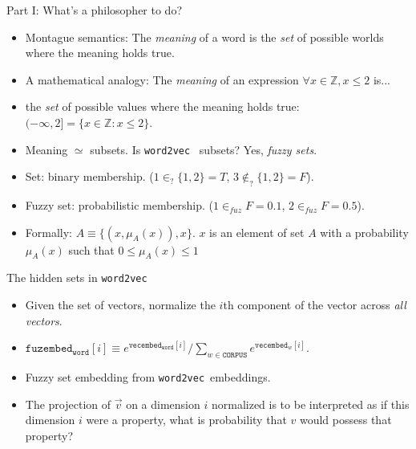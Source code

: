\documentclass[8pt]{beamer}
\newcommand{\Z}{\mathbb Z}
\newcommand{\wtov}{\texttt{word2vec}}
\newcommand{\fuzembed}{\texttt{fuzembed}}
\newcommand{\vecembed}{\texttt{vecembed}}
\newcommand{\CORPUS}{\texttt{CORPUS}}
\newcommand{\word}{\texttt{word}}
\begin{document}
\begin{frame}{Part I: What's a philosopher to do?}
\begin{itemize}
    \item Montague semantics: The \emph{meaning} of a word is the \emph{set} of possible worlds where the meaning holds true. \pause
    \item A mathematical analogy: The \emph{meaning} of an expression $\forall x \in \Z, x \leq 2$ is... \pause
    \item  the \emph{set} of possible values where the meaning holds true: $(-\infty, 2] = \{  x \in \Z : x \leq 2 \}$. \pause
    \item Meaning $\simeq$ subsets. Is  \wtov~ subsets?  \pause Yes, \emph{fuzzy sets}. \pause
    \item Set: binary membership. ($1 \in_? \{1, 2\} = T$, $3 \not \in_? \{1, 2\} = F$). \pause
    \item Fuzzy set: probabilistic membership. ($1 \in_{fuz} F = 0.1$, $2 \in_{fuz} F = 0.5$).
    \item Formally:  $A \equiv \{ (x, \mu_A(x)), x \}$. $x$ is
      an element of set $A$ with a probability $\mu_A(x)$ such that $0 \leq \mu_A(x) \leq 1$
\end{itemize}
\end{frame}

\begin{frame}{The hidden sets in \texttt{word2vec}}
\begin{itemize}
  \item Given the set of vectors, normalize the $i$th component of the vector across \emph{all vectors}. \pause
  \item $\fuzembed_{\word}[i] \equiv e^{\vecembed_{\word}[i]} / \sum_{w \in \CORPUS} e^{\vecembed_w[i]}$. \pause
  \item Fuzzy set embedding from \texttt{word2vec}~embeddings. \pause
  \item The projection of $\vec v$ on a dimension $i$ normalized  is to be interpreted as
  if this dimension $i$ were a property, what is probability that $v$ would possess that property?
\end{itemize}
\end{frame}
\end{document}
